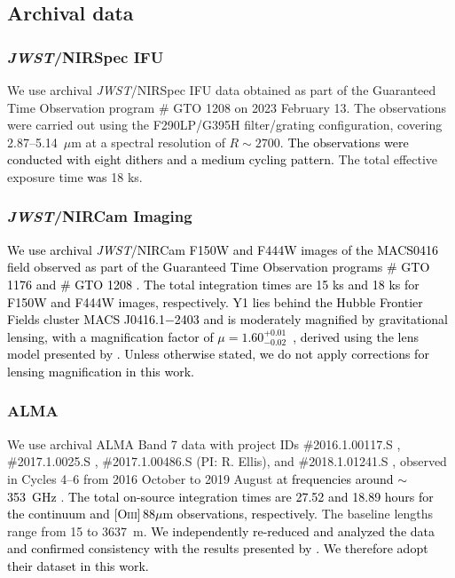 \documentclass[trackchanges,twocolumn]{aastex701}
\newcommand{\ca}[1]{\textcolor{black}{#1}} %
\newcommand{\cd}[1]{\textcolor{black}{#1}} %
\newcommand{\ckt}[1]{\textcolor{black}{#1}}
\newcommand{\ci}[1]{\textcolor{black}{#1}}
\newcommand{\cj}[1]{\textcolor{black}{#1}}
\newcommand{\cn}[1]{\textcolor{black}{#1}}
\begin{document}
\subsection{Archival data}
\subsubsection{\textit{JWST}/NIRSpec IFU}
We use archival \textit{JWST}/NIRSpec IFU data obtained as part of the Guaranteed Time Observation program \# GTO 1208 \citep[CANUCS;][]{Willott2022} on 2023 February 13. The observations were carried out using the F290LP/G395H filter/grating configuration, covering 2.87--5.14~$\mu$m at a spectral resolution of $R\sim2700$. \ca{The observations were conducted with eight dithers and a medium cycling pattern.} The total effective exposure time \cd{was} 18 ks.




\subsubsection{\textit{JWST}/NIRCam Imaging}
\ci{We use archival \textit{JWST}/NIRCam F150W and F444W images of the MACS0416 field observed as part of the Guaranteed Time Observation programs \# GTO 1176 \citep[PEARLS;][]{Windhorst2023} and \# GTO 1208 \citep[CANUCS;][]{Willott2022}. The total integration times are 15 ks and 18 ks for F150W and F444W images, respectively.}
\cj{Y1 lies behind the Hubble Frontier Fields cluster MACS J0416.1$-$2403 and is moderately magnified by gravitational lensing, \cn{with a magnification factor of $\mu =1.60^{+0.01}_{-0.02}$~\citep{Harshan2024}, derived using the lens model presented by \citep{Rihtarsic2024}.} Unless otherwise stated, we do not apply corrections for lensing magnification in this work. }

\subsubsection{ALMA}
We use archival ALMA Band 7 data with project IDs \#2016.1.00117.S \citep[PI: Y. Tamura;][]{Tamura2019}, \#2017.1.0025.S \citep[PI: Y. Tamura;][]{Tamura2023}, \#2017.1.00486.S (PI: R. Ellis), and \#2018.1.01241.S \citep[PI: Y. Tamura;][]{Tamura2023}, observed in Cycles 4--6 from 2016 October to 2019 August \cd{at frequencies around $\sim$353~GHz }\citep[see Table 1 of][]{Tamura2023}. \cn{The total on-source integration times are 27.52 and 18.89 hours for the continuum and [\textsc{Oiii}]\,88$\mu$m observations, respectively.} The baseline lengths range from 15 to 3637~m.
\ckt{We independently re-reduced and analyzed the data and confirmed consistency with the results presented by \citet{Tamura2023}. We therefore adopt their dataset in this work. }
\end{document}
